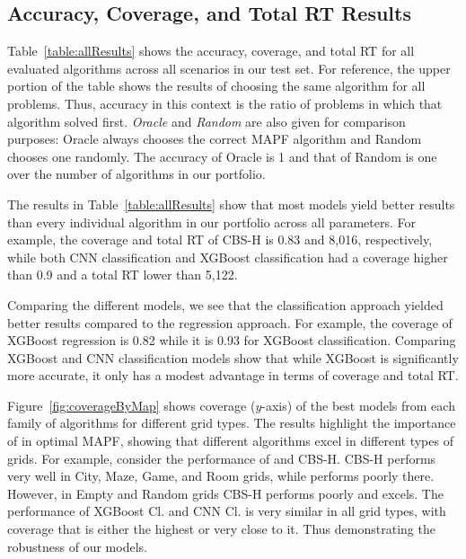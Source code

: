 \documentclass[letterpaper]{article} %
\newcommand\Roni[1]{\nb{\textbf{Roni:}}{red}{#1}}
\begin{document}
\subsection{Accuracy, Coverage, and Total RT Results}
Table~\ref{table:allResults} shows the accuracy, coverage, and total RT for all evaluated algorithms across all scenarios in our test set. For reference, the upper portion of the table shows the results of choosing the same algorithm for all problems. 
Thus, accuracy in this context is the ratio of problems in which that algorithm solved first. \emph{Oracle} and \emph{Random} are also given for comparison purposes: Oracle always chooses the correct MAPF algorithm and Random chooses one randomly. The accuracy of Oracle is 1 and that of Random is one over the number of algorithms in our portfolio. 


The results in Table~\ref{table:allResults} show 
that most \AS models yield better results than every individual algorithm in our portfolio across all parameters. For example, the coverage and total RT of CBS-H is 0.83 and 8,016, respectively, while both CNN classification and XGBoost classification had a coverage higher than 0.9 and a total RT lower than 5,122. 


Comparing the different \AS models, we see that the classification approach yielded better results compared to the regression approach. For example, the coverage of XGBoost regression is 0.82 while it is 0.93 for XGBoost classification. 
Comparing XGBoost and CNN classification models 
show that while XGBoost is significantly more accurate, it only has a modest advantage in terms of coverage and total RT. 



Figure~\ref{fig:coverageByMap} shows coverage ($y$-axis) of the best models from each family of algorithms for different grid types. 
The results highlight the importance of \AS in optimal MAPF, showing that different algorithms excel in different types of grids. For example, consider the performance of \epea and CBS-H. 
CBS-H performs very well in City, Maze, Game, and Room grids, 
while \epea performs poorly there. However, in Empty and Random grids CBS-H performs poorly and \epea excels. 
The performance of XGBoost Cl. and CNN Cl. is very similar in all grid types, with coverage that is either the highest or very close to it. 
Thus demonstrating the robustness of our \AS models. 
\end{document}
